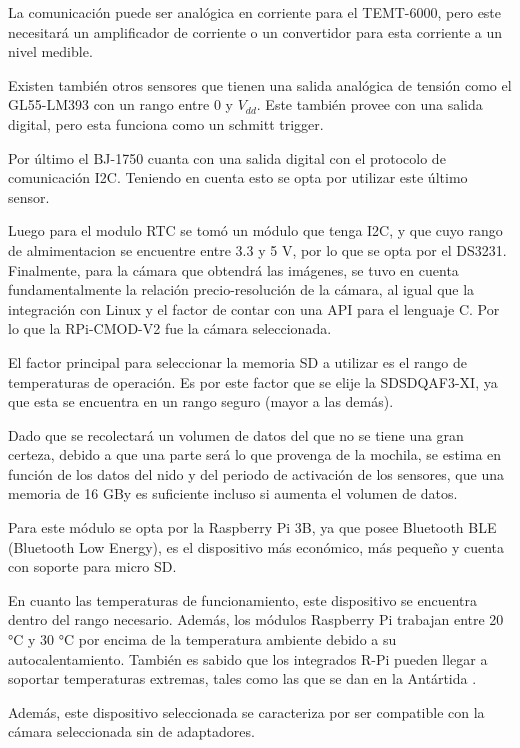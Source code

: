 La comunicación puede ser analógica en corriente para el TEMT-6000, pero este necesitará un amplificador de corriente o un convertidor para esta corriente a un nivel medible.

Existen también otros sensores que tienen una salida analógica de tensión como el GL55-LM393 con un rango entre 0 y $V_{dd}$. Este también provee con una salida digital, pero esta funciona como un schmitt trigger.

Por último el BJ-1750 cuanta con una salida digital con el protocolo de comunicación I2C. Teniendo en cuenta esto se opta por utilizar este último sensor. 

Luego para el modulo RTC se tom\'o un  m\'odulo que tenga I2C, y que cuyo rango de almimentacion se encuentre entre 3.3 y 5 V, por lo que se opta por el DS3231.
Finalmente, para la cámara que obtendrá las imágenes, se tuvo en cuenta fundamentalmente la relación precio-resolución de la cámara, al igual que la integración con Linux y el factor de contar con una API para el lenguaje C. Por lo que la RPi-CMOD-V2 fue la cámara seleccionada.



El factor principal para seleccionar la memoria SD a utilizar es el rango de temperaturas de operación. Es por este factor que se elije la SDSDQAF3-XI, ya que esta se encuentra en un rango seguro (mayor a las demás).

Dado que se recolectará un volumen de datos del que no se tiene una gran certeza, debido a que una parte será lo que provenga de la mochila, se estima en función de los datos del nido y del periodo de activación de los sensores, que una memoria de 16 GBy es suficiente incluso si aumenta el volumen de datos.


Para este módulo se opta por la Raspberry Pi 3B, ya que posee Bluetooth BLE (Bluetooth Low Energy), es el dispositivo más económico, más pequeño y cuenta con soporte para micro SD.

En cuanto las temperaturas de funcionamiento, este dispositivo se encuentra dentro del rango necesario. Además, los módulos Raspberry Pi trabajan entre 20 °C y 30 °C por encima de la temperatura ambiente debido a su autocalentamiento. También es sabido que los integrados R-Pi pueden llegar a soportar temperaturas extremas, tales como las que se dan en la Antártida \cite{ref:Penguin}.

Además, este dispositivo seleccionada se caracteriza por ser compatible con la cámara seleccionada sin  de adaptadores.

